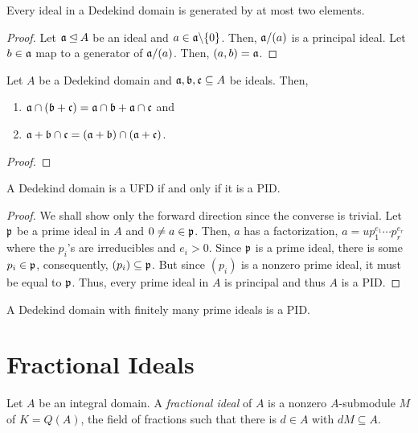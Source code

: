 \begin{corollary}
    Every ideal in a Dedekind domain is generated by at most two elements.
\end{corollary}
\begin{proof}
    Let $\mathfrak a\unlhd A$ be an ideal and $a\in\mathfrak a\backslash\{0\}$. Then, $\mathfrak a/(a)$ is a principal ideal. Let $b\in\mathfrak a$ map to a generator of $\mathfrak a/(a)$. Then, $(a,b) = \mathfrak a$.
\end{proof}

\begin{proposition}
    Let $A$ be a Dedekind domain and $\mathfrak a,\mathfrak b,\mathfrak c\subseteq A$ be ideals. Then, 
    \begin{enumerate}[label=(\alph*)]
        \item $\mathfrak a\cap(\mathfrak b + \mathfrak c) = \mathfrak a\cap\mathfrak b + \mathfrak a\cap\mathfrak c$ and
        \item $\mathfrak a + \mathfrak b\cap\mathfrak c = (\mathfrak a + \mathfrak b)\cap(\mathfrak a + \mathfrak c)$.
    \end{enumerate}
\end{proposition}
\begin{proof}
\end{proof}

\begin{proposition}
    A Dedekind domain is a UFD if and only if it is a PID.
\end{proposition}
\begin{proof}
    We shall show only the forward direction since the converse is trivial. Let $\mathfrak p$ be a prime ideal in $A$ and $0\ne a\in\mathfrak p$. Then, $a$ has a factorization, $a = up_1^{e_1}\cdots p_r^{e_r}$ where the $p_i$'s are irreducibles and $e_i > 0$. Since $\mathfrak p$ is a prime ideal, there is some $p_i\in\mathfrak p$, consequently, $(p_i)\subseteq\mathfrak p$. But since $(p_i)$ is a nonzero prime ideal, it must be equal to $\mathfrak p$. Thus, every prime ideal in $A$ is principal and thus $A$ is a PID.
\end{proof}

\begin{proposition}
    A Dedekind domain with finitely many prime ideals is a PID.
\end{proposition}

\section{Fractional Ideals}

\begin{definition}
    Let $A$ be an integral domain. A \emph{fractional ideal} of $A$ is a nonzero $A$-submodule $M$ of $K = Q(A)$, the field of fractions such that there is $d\in A$ with $dM\subseteq A$.
\end{definition}

